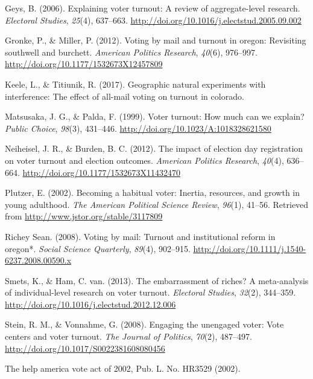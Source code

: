 \documentclass[12pt,twoside]{reedthesis}
\begin{document}
  \hypertarget{ref-geys_explaining_2006}{}
  Geys, B. (2006). Explaining voter turnout: A review of aggregate-level
  research. \emph{Electoral Studies}, \emph{25}(4), 637--663.
  \url{http://doi.org/10.1016/j.electstud.2005.09.002}
  
  \hypertarget{ref-gronke_voting_2012}{}
  Gronke, P., \& Miller, P. (2012). Voting by mail and turnout in oregon:
  Revisiting southwell and burchett. \emph{American Politics Research},
  \emph{40}(6), 976--997. \url{http://doi.org/10.1177/1532673X12457809}
  
  \hypertarget{ref-keele_geographic_2017}{}
  Keele, L., \& Titiunik, R. (2017). Geographic natural experiments with
  interference: The effect of all-mail voting on turnout in colorado.
  
  \hypertarget{ref-matsusaka_voter_1999}{}
  Matsusaka, J. G., \& Palda, F. (1999). Voter turnout: How much can we
  explain? \emph{Public Choice}, \emph{98}(3), 431--446.
  \url{http://doi.org/10.1023/A:1018328621580}
  
  \hypertarget{ref-neiheisel_impact_2012}{}
  Neiheisel, J. R., \& Burden, B. C. (2012). The impact of election day
  registration on voter turnout and election outcomes. \emph{American
  Politics Research}, \emph{40}(4), 636--664.
  \url{http://doi.org/10.1177/1532673X11432470}
  
  \hypertarget{ref-plutzer_becoming_2002}{}
  Plutzer, E. (2002). Becoming a habitual voter: Inertia, resources, and
  growth in young adulthood. \emph{The American Political Science Review},
  \emph{96}(1), 41--56. Retrieved from
  \url{http://www.jstor.org/stable/3117809}
  
  \hypertarget{ref-richey_sean_voting_2008}{}
  Richey Sean. (2008). Voting by mail: Turnout and institutional reform in
  oregon*. \emph{Social Science Quarterly}, \emph{89}(4), 902--915.
  \url{http://doi.org/10.1111/j.1540-6237.2008.00590.x}
  
  \hypertarget{ref-smets_embarrassment_2013}{}
  Smets, K., \& Ham, C. van. (2013). The embarrassment of riches? A
  meta-analysis of individual-level research on voter turnout.
  \emph{Electoral Studies}, \emph{32}(2), 344--359.
  \url{http://doi.org/10.1016/j.electstud.2012.12.006}
  
  \hypertarget{ref-stein_engaging_2008}{}
  Stein, R. M., \& Vonnahme, G. (2008). Engaging the unengaged voter: Vote
  centers and voter turnout. \emph{The Journal of Politics}, \emph{70}(2),
  487--497. \url{http://doi.org/10.1017/S0022381608080456}
  
  \hypertarget{ref-robert_nay_help_2002}{}
  The help america vote act of 2002, Pub. L. No. HR3529 (2002).


\end{document}
